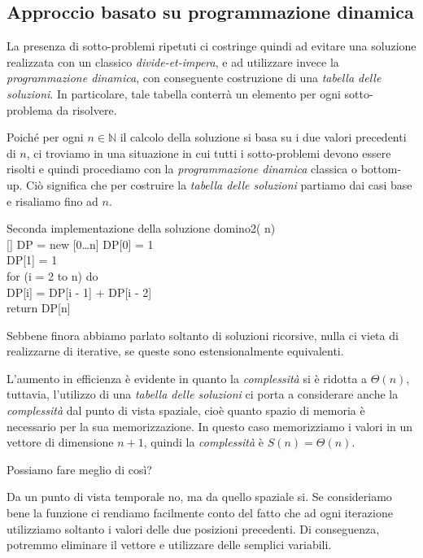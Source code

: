 \subsection{Approccio basato su programmazione dinamica}
La presenza di sotto-problemi ripetuti ci costringe quindi ad evitare una
soluzione realizzata con un classico \emph{divide-et-impera}, e ad utilizzare
invece la \emph{programmazione dinamica}, con conseguente costruzione di una
\emph{tabella delle soluzioni}. In particolare, tale tabella conterrà un elemento
per ogni sotto-problema da risolvere.

Poiché per ogni $n\in\mathbb{N}$ il calcolo della soluzione si basa su i due
valori precedenti di $n$, ci troviamo in una situazione in cui tutti i
sotto-problemi devono essere risolti e quindi procediamo con la
\emph{programmazione dinamica} classica o bottom-up. Ciò significa che per
costruire la \emph{tabella delle soluzioni} partiamo dai casi base e risaliamo
fino ad $n$.

\begin{minicode}{Seconda implementazione della soluzione}
    \ind{} domino2( n)\\
        [] DP = new [0\dots n]\hfill{}
        DP[0] = 1\\
        DP[1] = 1\\
        \indf for (i = 2 to n) do\\
            DP[i] = DP[i - 1] + DP[i - 2]\\
        \indf return DP[n]
\end{minicode}
\begin{note}
    Sebbene finora abbiamo parlato soltanto di soluzioni ricorsive, nulla ci
    vieta di realizzarne di iterative, se queste sono estensionalmente equivalenti.
\end{note}\noindent
L'aumento in efficienza è evidente in quanto la \emph{complessità} si è ridotta
a $\Theta(n)$, tuttavia, l'utilizzo di una \emph{tabella delle soluzioni} ci
porta a considerare anche la \emph{complessità} dal punto di vista spaziale, cioè
quanto spazio di memoria è necessario per la sua memorizzazione. In questo caso
memorizziamo i valori in un vettore di dimensione $n+1$, quindi la
\emph{complessità} è $S(n)=\Theta(n)$.

\bigskip\noindent Possiamo fare meglio di così?

Da un punto di vista temporale no, ma da quello spaziale si. Se consideriamo bene
la funzione ci rendiamo facilmente conto del fatto che ad ogni iterazione
utilizziamo soltanto i valori delle due posizioni precedenti. Di conseguenza,
potremmo eliminare il vettore e utilizzare delle semplici variabili.

